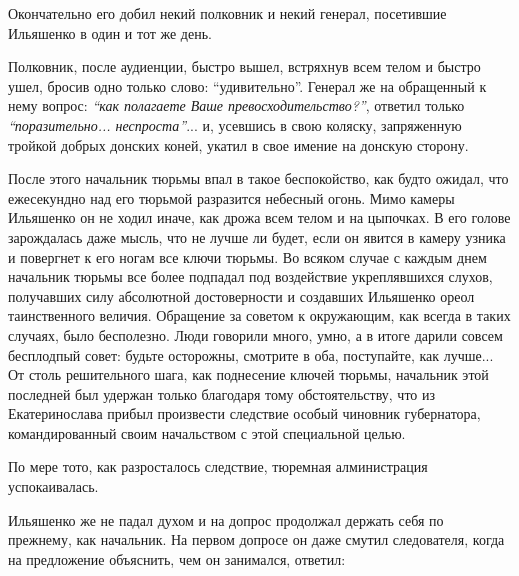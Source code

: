 \documentclass[a4paper,20pt]{article}
\begin{document}
Окончательно его добил некий полковник и некий генерал, посетившие Ильяшенко в
один и тот же день.

Полковник, после аудиенции, быстро вышел, встряхнув всем телом и быстро ушел,
бросив одно только слово: ``удивительно''. Генерал же на обращенный к нему
вопрос: \emph{``как полагаете Ваше превосходительство?''}, ответил только
\emph{``поразительно... неспроста''}... и, усевшись в свою коляску, запряженную
тройкой добрых донских коней, укатил в свое имение на донскую сторону.

После этого начальник тюрьмы впал в такое беспокойство, как будто ожидал, что
ежесекундно над его тюрьмой разразится небесный огонь. Мимо камеры Ильяшенко он
не ходил иначе, как дрожа всем телом и на цыпочках.  В его голове зарождалась
даже мысль, что не лучше ли будет, если он явится в камеру узника и повергнет к
его ногам все ключи тюрьмы. Во всяком случае с каждым днем начальник тюрьмы все
более подпадал под воздействие укреплявшихся слухов, получавших силу абсолютной
достоверности и создавших Ильяшенко ореол таинственного величия. Обращение за
советом к окружающим, как всегда в таких случаях, было бесполезно.
Люди говорили много, умно, а в итоге дарили совсем бесплодпый совет: будьте
осторожны, смотрите в оба, поступайте, как лучше... От столь решительного шага,
как поднесение ключей тюрьмы, начальник этой последней был удержан только
благодаря тому обстоятельству, что из Екатеринослава прибыл произвести
следствие особый чиновник губернатора, командированный своим начальством с этой
специальной целью.

По мере тото, как разросталось следствие, тюремная
алминистрация успокаивалась.

Ильяшенко же не падал духом и на допрос продолжал держать себя по прежнему, как начальник.
На первом допросе он даже смутил следователя, когда на предложение объяснить, чем он занимался, ответил:
\end{document}
